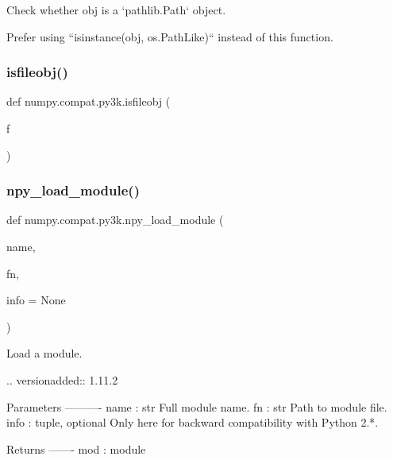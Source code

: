 \begin{DoxyVerb}Check whether obj is a `pathlib.Path` object.

Prefer using ``isinstance(obj, os.PathLike)`` instead of this function.
\end{DoxyVerb}
 \mbox{\label{namespacenumpy_1_1compat_1_1py3k_acb943fb634b941f7d79ac395862c3f1b}} 
\subsubsection{\texorpdfstring{isfileobj()}{isfileobj()}}
{\footnotesize\ttfamily def numpy.\+compat.\+py3k.\+isfileobj (\begin{DoxyParamCaption}\item[{}]{f }\end{DoxyParamCaption})}

\mbox{\label{namespacenumpy_1_1compat_1_1py3k_aa63d14ca8aedf8164ece7cc7c5483f6b}} 
\subsubsection{\texorpdfstring{npy\+\_\+load\+\_\+module()}{npy\_load\_module()}}
{\footnotesize\ttfamily def numpy.\+compat.\+py3k.\+npy\+\_\+load\+\_\+module (\begin{DoxyParamCaption}\item[{}]{name,  }\item[{}]{fn,  }\item[{}]{info = {\ttfamily None} }\end{DoxyParamCaption})}

\begin{DoxyVerb}Load a module.

.. versionadded:: 1.11.2

Parameters
----------
name : str
    Full module name.
fn : str
    Path to module file.
info : tuple, optional
    Only here for backward compatibility with Python 2.*.

Returns
-------
mod : module\end{DoxyVerb}
 \mbox{\label{namespacenumpy_1_1compat_1_1py3k_ad16580ea722ec9e6647dbedab2d1ad8c}} 
